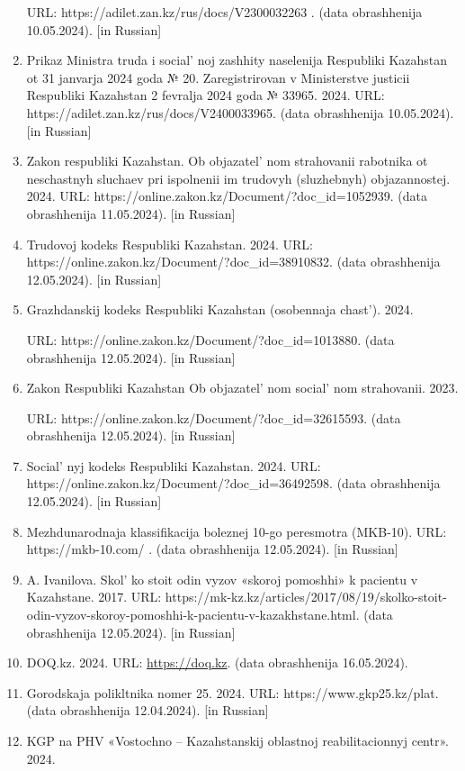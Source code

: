 \begin{references}
\begin{enumerate}
  URL:
  https://adilet.zan.kz/rus/docs/V2300032263 . (data obrashhenija
  10.05.2024). {[}in Russian{]}
\item
  Prikaz Ministra truda i social' noj zashhity naselenija
  Respubliki Kazahstan ot 31 janvarja 2024 goda № 20. Zaregistrirovan v
  Ministerstve justicii Respubliki Kazahstan 2 fevralja 2024 goda №
  33965. 2024. URL: https://adilet.zan.kz/rus/docs/V2400033965. (data
  obrashhenija 10.05.2024). {[}in Russian{]}
\item
  Zakon respubliki Kazahstan. Ob objazatel' nom
  strahovanii rabotnika ot neschastnyh sluchaev pri ispolnenii im
  trudovyh (sluzhebnyh) objazannostej. 2024. URL:
  https://online.zakon.kz/Document/?doc\_id=1052939. (data obrashhenija
  11.05.2024). {[}in Russian{]}
\item
  Trudovoj kodeks Respubliki Kazahstan. 2024. URL:
  https://online.zakon.kz/Document/?doc\_id=38910832. (data obrashhenija
  12.05.2024). {[}in Russian{]}
\item
  Grazhdanskij kodeks Respubliki Kazahstan (osobennaja
  chast'). 2024. 
  
  URL:
  https://online.zakon.kz/Document/?doc\_id=1013880. (data obrashhenija
  12.05.2024). {[}in Russian{]}
\item
  Zakon Respubliki Kazahstan Ob objazatel' nom
  social' nom strahovanii. 2023. 
  
  URL:
  https://online.zakon.kz/Document/?doc\_id=32615593. (data obrashhenija
  12.05.2024). {[}in Russian{]}
\item
  Social' nyj kodeks Respubliki Kazahstan. 2024. URL:
  https://online.zakon.kz/Document/?doc\_id=36492598. (data obrashhenija
  12.05.2024). {[}in Russian{]}
\item
  Mezhdunarodnaja klassifikacija boleznej 10-go peresmotra (MKB-10).
  URL: https://mkb-10.com/ . (data obrashhenija 12.05.2024). {[}in
  Russian{]}
\item
  A. Ivanilova. Skol' ko stoit odin vyzov «skoroj
  pomoshhi» k pacientu v Kazahstane. 2017. URL:
  https://mk-kz.kz/articles/2017/08/19/skolko-stoit-odin-vyzov-skoroy-pomoshhi-k-pacientu-v-kazakhstane.html.
  (data obrashhenija 12.05.2024). {[}in Russian{]}
\item
  DOQ.kz. 2024. URL:
  \href{https://doq.kz/services/almaty/categories/mrt?gad_source=1&gclid=CjwKCAjw5ImwBhBtEiwAFHDZx1jdiACtpccbd7w4T7jNd9z0quYofYTaqJgjJZ7mmaOK3zG6MKI_xoCh2QQAvD_BwE}{https://doq.kz}.
  (data obrashhenija 16.05.2024).
\item
  Gorodskaja polikltnika nomer 25. 2024. URL: https://www.gkp25.kz/plat.
  (data obrashhenija 12.04.2024). {[}in Russian{]}
\item
  KGP na PHV «Vostochno -- Kazahstanskij oblastnoj reabilitacionnyj
  centr». 2024. 
  

\end{enumerate}
\end{references}

